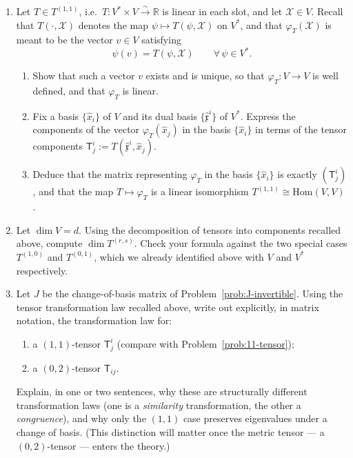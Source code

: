 \documentclass[11pt]{article}
\newcommand{\dual}{V^{*}}
\newcommand{\linto}{\overset{\sim}{\longrightarrow}}
\begin{document}
\begin{enumerate}[label=\textbf{2.\arabic*}, leftmargin=2.2cm, start=10]

\item \label{prob:11-tensor}
Let $T\in T^{(1,1)}$, i.e.\ $T:\dual\times V\linto\mathbb R$ is linear in each slot, and let $\mathcal X\in V$. Recall that $T(\cdot,\mathcal X)$ denotes the map $\psi\mapsto T(\psi,\mathcal X)$ on $\dual$, and that $\varphi_T(\mathcal X)$ is meant to be the vector $v\in V$ satisfying
\[
\psi(v)=T(\psi,\mathcal X)\qquad\forall\,\psi\in\dual.
\]
\begin{enumerate}[label=(\alph*)]
  \item Show that such a vector $v$ exists and is unique, so that $\varphi_T:V\to V$ is well defined, and that $\varphi_T$ is linear.
  \item Fix a basis $\{\hat{x}_i\}$ of $V$ and its dual basis $\{\hat{\mathfrak{x}}^i\}$ of $\dual$. Express the components of the vector $\varphi_T(\hat{x}_j)$ in the basis $\{\hat{x}_i\}$ in terms of the tensor components $\mathsf{T}^i_j := T(\hat{\mathfrak{x}}^i, \hat{x}_j)$.
  \item Deduce that the matrix representing $\varphi_T$ in the basis $\{\hat{x}_i\}$ is exactly $(\mathsf{T}^i_j)$, and that the map $T \mapsto \varphi_T$ is a linear isomorphism $T^{(1,1)} \cong \mathrm{Hom}(V,V)$.
\end{enumerate}

\item \label{prob:dim-count}
Let $\dim V = d$. Using the decomposition of tensors into components recalled above, compute $\dim T^{(r,s)}$. Check your formula against the two special cases $T^{(1,0)}$ and $T^{(0,1)}$, which we already identified above with $V$ and $\dual$ respectively.

\item \label{prob:congruence-vs-similarity}
Let $J$ be the change-of-basis matrix of Problem~\ref{prob:J-invertible}. Using the tensor transformation law recalled above, write out explicitly, in matrix notation, the transformation law for:
\begin{enumerate}[label=(\alph*)]
  \item a $(1,1)$-tensor $\mathsf{T}^i_j$ (compare with Problem~\ref{prob:11-tensor});
  \item a $(0,2)$-tensor $\mathsf{T}_{ij}$.
\end{enumerate}
Explain, in one or two sentences, why these are structurally different transformation laws (one is a \emph{similarity} transformation, the other a \emph{congruence}), and why only the $(1,1)$ case preserves eigenvalues under a change of basis. (This distinction will matter once the metric tensor --- a $(0,2)$-tensor --- enters the theory.)

\end{enumerate}
\end{document}
